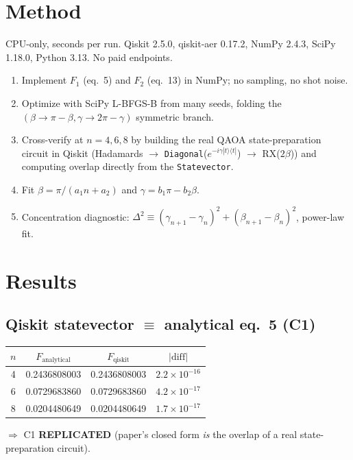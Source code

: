 \documentclass[11pt]{article}
\begin{document}
\section{Method}
CPU-only, seconds per run. Qiskit 2.5.0, qiskit-aer 0.17.2, NumPy 2.4.3,
SciPy 1.18.0, Python 3.13. No paid endpoints.
\begin{enumerate}
  \item Implement $F_{1}$ (eq.~5) and $F_{2}$ (eq.~13) in NumPy;
        no sampling, no shot noise.
  \item Optimize with SciPy L-BFGS-B from many seeds, folding the
        $(\beta \to \pi-\beta, \gamma \to 2\pi-\gamma)$ symmetric branch.
  \item Cross-verify at $n=4,6,8$ by building the real QAOA
        state-preparation circuit in Qiskit
        (Hadamards $\to$ \texttt{Diagonal}($e^{-i\gamma|t\rangle\langle t|}$)
        $\to$ RX($2\beta$)) and computing overlap directly from the
        \texttt{Statevector}.
  \item Fit $\beta = \pi/(a_{1}n+a_{2})$ and $\gamma = b_{1}\pi - b_{2}\beta$.
  \item Concentration diagnostic: $\Delta^{2} \equiv
        (\gamma_{n+1}-\gamma_{n})^{2}+(\beta_{n+1}-\beta_{n})^{2}$, power-law fit.
\end{enumerate}

\section{Results}
\subsection{Qiskit statevector $\equiv$ analytical eq.~5 (C1)}
\begin{center}\begin{tabular}{cccc}\toprule
$n$ & $F_{\text{analytical}}$ & $F_{\text{qiskit}}$ & $|\text{diff}|$ \\ \midrule
4 & 0.2436808003 & 0.2436808003 & $2.2\times10^{-16}$ \\
6 & 0.0729683860 & 0.0729683860 & $4.2\times10^{-17}$ \\
8 & 0.0204480649 & 0.0204480649 & $1.7\times10^{-17}$ \\ \bottomrule
\end{tabular}\end{center}
$\Rightarrow$ C1 \textbf{REPLICATED} (paper's closed form \emph{is} the
overlap of a real state-preparation circuit).
\end{document}
